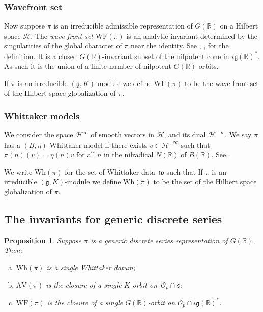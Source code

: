 \documentclass[10pt,leqno]{article}
\newtheorem{proposition}[equation]{Proposition}
\newcommand{\mH}{\mathcal H}
\newcommand{\R}{\mathbb R}
\newcommand{\g}{\mathfrak g}
\newcommand{\w}{\mathfrak w}
\newcommand{\AV}{\mathrm{AV}}
\newcommand{\Wh}{\mathrm{Wh}}
\newcommand{\WF}{\mathrm{WF}}
\begin{document}
\subsubsection*{Wavefront set}

Now suppose $\pi$ is an irreducible admissible representation of $G(\R)$ on a Hilbert space $\mH$. 
The \emph{wave-front
  set} $\WF(\pi)$ is an analytic invariant determined by the
singularities of the global character of $\pi$ near the identity. See \cite{howe_wave_front}, \cite{bv_local_structure},
\cite{HarrisHeOlafsson} for the definition. 
It is a closed $G(\R)$-invariant subset of the nilpotent cone in
$i\g(\R)^*$. As such it is the union of a finite number of nilpotent $G(\R)$-orbits.

If $\pi$ is an irreducible $(\g,K)$-module we define $\WF(\pi)$ to be the wave-front set of 
the Hilbert space globalization of $\pi$.

\subsubsection*{Whittaker models}

We consider the space $\mH^\infty$ of smooth vectors in $\mH$, and its dual $\mH^{-\infty}$. We say $\pi$ has a $(B,\eta)$-Whittaker model
if there exists $v\in \mH^{-\infty}$ such that $\pi(n)(v)=\eta(n)v$ for all $n$ in the nilradical $N(\R)$ of $B(\R)$.
See \cite{matumoto}. 


We write $\Wh(\pi)$ for the set of Whittaker data~$\w$ such that If $\pi$ is an irreducible $(\g,K)$-module we define $\Wh(\pi)$ to be the set of 
the Hilbert space globalization of $\pi$.


\subsection{The invariants for generic discrete series} 

\begin{proposition} \label{invariants_ds}
  Suppose $\pi$ is a generic discrete series representation of $G(\R)$. Then:
\begin{enumerate}[(a)]
\item $\Wh(\pi)$ is a single Whittaker datum;
\item $\AV(\pi)$ is the closure of a single $K$-orbit on~$\mathcal{O}_p \cap \mathfrak{s}$;
\item  $\WF(\pi)$ is the closure of a single $G(\R)$-orbit on $\mathcal{O}_p \cap  i \g(\R)^*$.
\end{enumerate}
\end{proposition}
\end{document}
